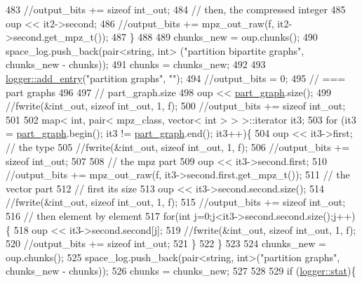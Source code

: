 \begin{DoxyCode}
483     \textcolor{comment}{//output\_bits += sizeof int\_out;}
484     \textcolor{comment}{// then, the compressed integer}
485     oup << it2->second;
486     \textcolor{comment}{//output\_bits += mpz\_out\_raw(f, it2->second.get\_mpz\_t());}
487   \}
488 
489   chunks\_new = oup.chunks();
490   space\_log.push\_back(pair<string, int> (\textcolor{stringliteral}{"partition bipartite graphs"}, chunks\_new - chunks));
491   chunks = chunks\_new;
492 
493   \hyperlink{classlogger_a710163deb17bc81f70d53d285b8ac9ac}{logger::add\_entry}(\textcolor{stringliteral}{"partition graphs"}, \textcolor{stringliteral}{""});
494   \textcolor{comment}{//output\_bits = 0;}
495   \textcolor{comment}{// === part graphs}
496 
497   \textcolor{comment}{// part\_graph.size}
498   oup <<  \hyperlink{classmarked__graph__compressed_ae179a4737e6eab905c18a94d44ef64b7}{part\_graph}.size();
499   \textcolor{comment}{//fwrite(&int\_out, sizeof int\_out, 1, f);}
500   \textcolor{comment}{//output\_bits += sizeof int\_out;}
501 
502   map< int, pair< mpz\_class, vector< int > > >::iterator it3;
503   \textcolor{keywordflow}{for} (it3 = \hyperlink{classmarked__graph__compressed_ae179a4737e6eab905c18a94d44ef64b7}{part\_graph}.begin(); it3 != \hyperlink{classmarked__graph__compressed_ae179a4737e6eab905c18a94d44ef64b7}{part\_graph}.end(); it3++)\{
504     oup <<  it3->first; \textcolor{comment}{// the type}
505     \textcolor{comment}{//fwrite(&int\_out, sizeof int\_out, 1, f);}
506     \textcolor{comment}{//output\_bits += sizeof int\_out;}
507 
508     \textcolor{comment}{// the mpz part}
509     oup << it3->second.first;
510     \textcolor{comment}{//output\_bits += mpz\_out\_raw(f, it3->second.first.get\_mpz\_t());}
511     \textcolor{comment}{// the vector part}
512     \textcolor{comment}{// first its size}
513     oup <<  it3->second.second.size();
514     \textcolor{comment}{//fwrite(&int\_out, sizeof int\_out, 1, f);}
515     \textcolor{comment}{//output\_bits += sizeof int\_out;}
516     \textcolor{comment}{// then element by element}
517     \textcolor{keywordflow}{for}(\textcolor{keywordtype}{int} j=0;j<it3->second.second.size();j++)\{
518       oup <<  it3->second.second[j];
519       \textcolor{comment}{//fwrite(&int\_out, sizeof int\_out, 1, f);}
520       \textcolor{comment}{//output\_bits += sizeof int\_out;}
521     \}
522   \}
523 
524   chunks\_new = oup.chunks();
525   space\_log.push\_back(pair<string, int>(\textcolor{stringliteral}{"partition graphs"}, chunks\_new - chunks));
526   chunks = chunks\_new;
527 
528   
529   \textcolor{keywordflow}{if} (\hyperlink{classlogger_a26812b5ba03f130e8dae3446d5fc032f}{logger::stat})\{

\end{DoxyCode}
